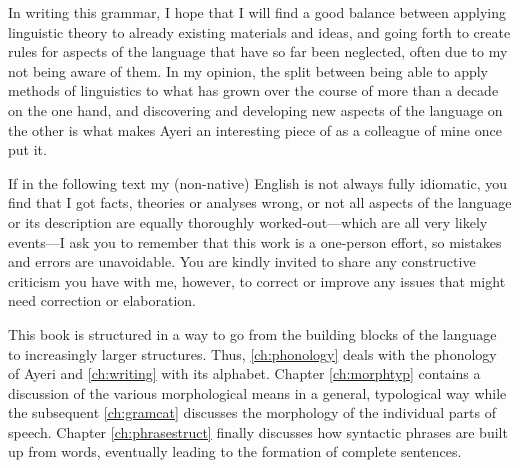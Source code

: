 In writing this grammar, I hope that I will find a good balance between 
applying linguistic theory to already existing materials and ideas, and going 
forth to create rules for aspects of the language that have so far been 
neglected, often due to my not being aware of them. In my opinion, the split 
between being able to apply methods of linguistics to what has grown over the 
course of more than a decade on the one hand, and discovering and developing 
new aspects of the language on the other is what makes Ayeri an interesting 
piece of  as a colleague of mine once put it.

If in the following text my (non-native) English is not always fully idiomatic,
you find that I got facts, theories or analyses wrong, or not all aspects of
the language or its description are equally thoroughly worked-out---which are
all very likely events---I ask you to remember that this work is a one-person
effort, so mistakes and errors are unavoidable. You are kindly invited to share
any constructive criticism you have with me, however, to correct or improve any
issues that might need correction or elaboration.

This book is structured in a way to go from the building blocks of the language
to increasingly larger structures. Thus, \autoref{ch:phonology} deals with the
phonology of Ayeri and \autoref{ch:writing} with its alphabet. Chapter
\ref{ch:morphtyp} contains a discussion of the various morphological means in a
general, typological way while the subsequent \autoref{ch:gramcat} discusses
the morphology of the individual parts of speech. Chapter \ref{ch:phrasestruct}
finally discusses how syntactic phrases are built up from words, eventually
leading to the formation of complete sentences.
